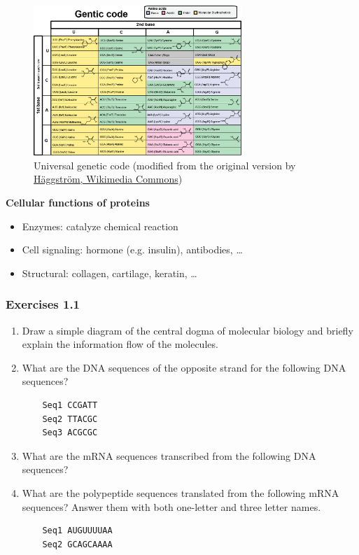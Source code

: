 \begin{figure}[H]
  \centering
      \includegraphics[width=0.7\textwidth]{fig01/genetic_code.png}
  \caption{Universal genetic code \newline (modified from the original version by \href{https://commons.wikimedia.org/wiki/File\%3ANotable_mutations.svg}{H\"aggstr\"om, Wikimedia Commons})}
\end{figure}

\noindent \textbf{Cellular functions of proteins}
\begin{itemize}
\item Enzymes: catalyze chemical reaction
\item Cell signaling: hormone (e.g. insulin), antibodies, …
\item Structural: collagen, cartilage, keratin, …
\end{itemize}

%
%
\subsubsection*{Exercises 1.1}
\begin{enumerate}

\item Draw a simple diagram of the central dogma of molecular biology and briefly explain the information flow of the molecules.

\item What are the DNA sequences of the opposite strand for the following DNA sequences?
\begin{verbatim}
    Seq1 CCGATT
    Seq2 TTACGC
    Seq3 ACGCGC
\end{verbatim}

\item What are the mRNA sequences transcribed from the following DNA sequences?

\item What are the polypeptide sequences translated from the following mRNA sequences? Answer them with both one-letter and three letter names.
\begin{verbatim}
    Seq1 AUGUUUUAA
    Seq2 GCAGCAAAA
\end{verbatim}
		
\end{enumerate}

%
